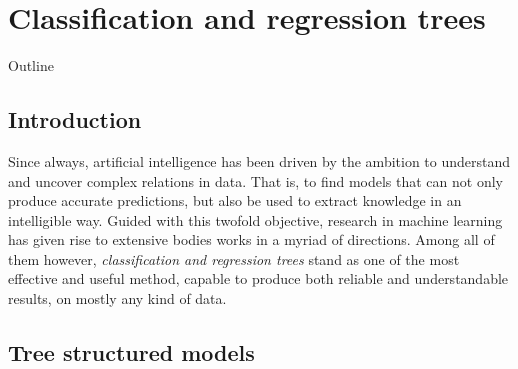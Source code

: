 \chapter{Classification and regression trees}\label{ch:cart}

\begin{remark}{Outline}
\lipsum[1]
\end{remark}

\section{Introduction}

Since always, artificial intelligence has been driven by the ambition to
understand and uncover complex relations in data. That is, to find models that
can not only produce accurate predictions, but also be used to extract
knowledge in an intelligible way. Guided with this twofold objective, research
in machine learning has given rise to extensive bodies works in a myriad of
directions. Among all of them however, \textit{classification and regression
trees} stand as one of the most effective and useful method, capable to
produce both reliable and understandable results, on mostly any kind of data.




\section{Tree structured models}


